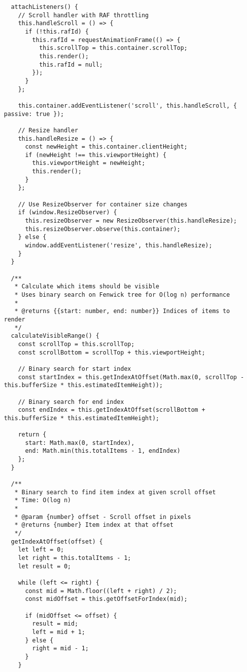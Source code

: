 \documentclass[11pt]{article}
\begin{document}
\begin{verbatim}
  attachListeners() {
    // Scroll handler with RAF throttling
    this.handleScroll = () => {
      if (!this.rafId) {
        this.rafId = requestAnimationFrame(() => {
          this.scrollTop = this.container.scrollTop;
          this.render();
          this.rafId = null;
        });
      }
    };
    
    this.container.addEventListener('scroll', this.handleScroll, { passive: true });
    
    // Resize handler
    this.handleResize = () => {
      const newHeight = this.container.clientHeight;
      if (newHeight !== this.viewportHeight) {
        this.viewportHeight = newHeight;
        this.render();
      }
    };
    
    // Use ResizeObserver for container size changes
    if (window.ResizeObserver) {
      this.resizeObserver = new ResizeObserver(this.handleResize);
      this.resizeObserver.observe(this.container);
    } else {
      window.addEventListener('resize', this.handleResize);
    }
  }
  
  /**
   * Calculate which items should be visible
   * Uses binary search on Fenwick tree for O(log n) performance
   * 
   * @returns {{start: number, end: number}} Indices of items to render
   */
  calculateVisibleRange() {
    const scrollTop = this.scrollTop;
    const scrollBottom = scrollTop + this.viewportHeight;
    
    // Binary search for start index
    const startIndex = this.getIndexAtOffset(Math.max(0, scrollTop - this.bufferSize * this.estimatedItemHeight));
    
    // Binary search for end index
    const endIndex = this.getIndexAtOffset(scrollBottom + this.bufferSize * this.estimatedItemHeight);
    
    return {
      start: Math.max(0, startIndex),
      end: Math.min(this.totalItems - 1, endIndex)
    };
  }
  
  /**
   * Binary search to find item index at given scroll offset
   * Time: O(log n)
   * 
   * @param {number} offset - Scroll offset in pixels
   * @returns {number} Item index at that offset
   */
  getIndexAtOffset(offset) {
    let left = 0;
    let right = this.totalItems - 1;
    let result = 0;
    
    while (left <= right) {
      const mid = Math.floor((left + right) / 2);
      const midOffset = this.getOffsetForIndex(mid);
      
      if (midOffset <= offset) {
        result = mid;
        left = mid + 1;
      } else {
        right = mid - 1;
      }
    }
    

\end{verbatim}
\end{document}

